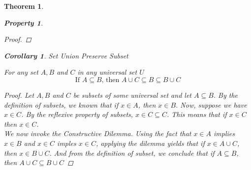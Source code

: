\documentclass{book}
\newtheorem{theorem}{Theorem}[section]
\newtheorem{property}{Property}[theorem]
\newtheorem{corollary}{Corollary}[theorem]
\theoremstyle{definition}
\theoremstyle{remark}
\begin{document}
\begin{theorem}
\begin{property}
\begin{proof}
        \end{proof}
    
    \smallskip
    
    \begin{corollary}
    Set Union Preserve Subset\\
        \begin{tcolorbox}
            For any set $A, B$ and $C$ in any universal set $U$
                \begin{equation*}
                    \text{If } A \subseteq B \text{, then } A \cup C \subseteq B \subseteq B \cup C
                \end{equation*}
        \end{tcolorbox}
    
        \begin{proof}
            Let  $A, B$ and $C$ be subsets of some universal set and let $A \subseteq B$. By the definition of subsets, we known that if $x \in A$, then $x \in B$. Now, suppose we have $x \in C$. By the reflexive property of subsets, $x \in C \subseteq C$. This means that if $x \in C$ then $x \in C$. \\ 
            We now invoke the \textit{Constructive Dilemma}. Using the fact that $x \in A$ implies $x \in B$ and $x \in C$ imples $x \in C$, applying the dilemma yields that if $x \in A \cup C$, then $x \in B \cup C$. And from the definition of subset, we conclude that if $A \subseteq B$, then $A \cup C \subseteq B \cup C$
        \end{proof}
    \end{corollary}
    
    \end{property}
    

\end{theorem}
\end{document}
